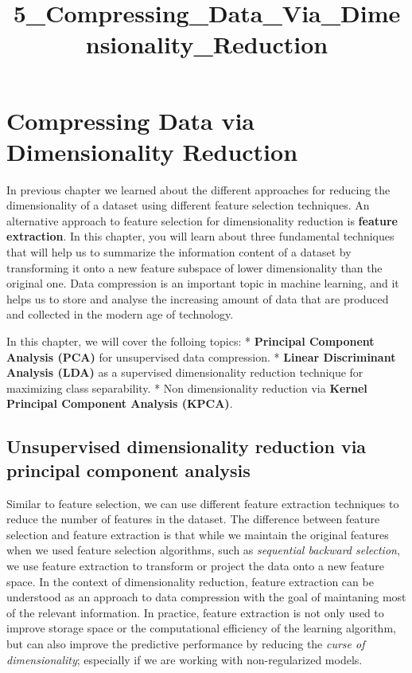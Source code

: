 \documentclass[11pt]{article}
\title{5\_Compressing\_Data\_Via\_Dimensionality\_Reduction}
\begin{document}
    
    
    \maketitle
    
    

    
    \section{Compressing Data via Dimensionality
Reduction}\label{compressing-data-via-dimensionality-reduction}

    In previous chapter we learned about the different approaches for
reducing the dimensionality of a dataset using different feature
selection techniques. An alternative approach to feature selection for
dimensionality reduction is \textbf{feature extraction}. In this
chapter, you will learn about three fundamental techniques that will
help us to summarize the information content of a dataset by
transforming it onto a new feature subspace of lower dimensionality than
the original one. Data compression is an important topic in machine
learning, and it helps us to store and analyse the increasing amount of
data that are produced and collected in the modern age of technology.

In this chapter, we will cover the folloing topics: * \textbf{Principal
Component Analysis (PCA)} for unsupervised data compression. *
\textbf{Linear Discriminant Analysis (LDA)} as a supervised
dimensionality reduction technique for maximizing class separability. *
Non dimensionality reduction via \textbf{Kernel Principal Component
Analysis (KPCA)}.

    \subsection{Unsupervised dimensionality reduction via principal
component
analysis}\label{unsupervised-dimensionality-reduction-via-principal-component-analysis}

    Similar to feature selection, we can use different feature extraction
techniques to reduce the number of features in the dataset. The
difference between feature selection and feature extraction is that
while we maintain the original features when we used feature selection
algorithms, such as \emph{sequential backward selection}, we use feature
extraction to transform or project the data onto a new feature space. In
the context of dimensionality reduction, feature extraction can be
understood as an approach to data compression with the goal of
maintaning most of the relevant information. In practice, feature
extraction is not only used to improve storage space or the
computational efficiency of the learning algorithm, but can also improve
the predictive performance by reducing the \emph{curse of
dimensionality}; especially if we are working with non-regularized
models.
\end{document}
